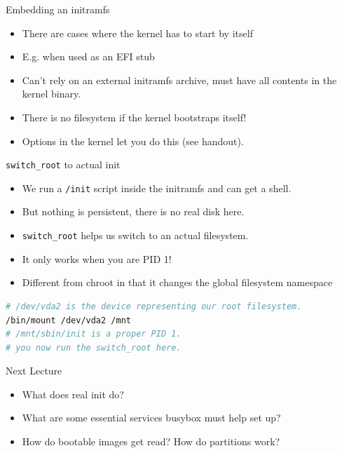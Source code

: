 \documentclass{../lecture}
\begin{document}
\begin{frame}{Embedding an initramfs}
  \begin{itemize}
    \item There are cases where the kernel has to start by itself
    \item E.g. when used as an EFI stub
    \item Can't rely on an external initramfs archive, must have all contents in
      the kernel binary.
    \item There is no filesystem if the kernel bootstraps itself!
    \item Options in the kernel let you do this (see handout).
  \end{itemize}
\end{frame}

\begin{frame}[fragile]{\texttt{switch\_root} to actual init}
  \begin{itemize}
    \item We run a \texttt{/init} script inside the initramfs and can get a
      shell.
    \item But nothing is persistent, there is no real disk here.
    \item \texttt{switch\_root} helps us switch to an actual filesystem.
    \item It only works when you are PID 1!
    \item Different from chroot in that it changes the global filesystem
      namespace
  \end{itemize}
\begin{lstlisting}[language=bash]
# /dev/vda2 is the device representing our root filesystem.
/bin/mount /dev/vda2 /mnt
# /mnt/sbin/init is a proper PID 1.
# you now run the switch_root here.
\end{lstlisting}
\end{frame}

\begin{frame}{Next Lecture}
  \begin{itemize}
    \item What does real init do?
    \item What are some essential services busybox must help set up?
    \item How do bootable images get read? How do partitions work?
  \end{itemize}
\end{frame}
\end{document}
